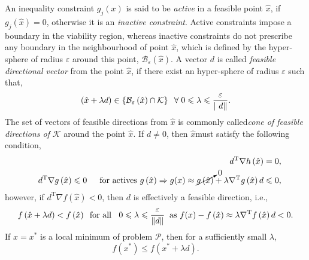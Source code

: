 An inequality constraint $g_{j}(x)$ is said to be {\it active} in a feasible point $\hat{x}$, if $g_{j}\left(\hat{x}\right)=0$, otherwise it is an {\it inactive constraint}. Active constraints impose a boundary in the viability region, whereas inactive constraints do not prescribe any boundary in the neighbourhood of point $\hat{x}$, which is defined by the hyper-sphere of radius $\varepsilon$ around this point, $\mathcal{B}_{\varepsilon}\left(\hat{x}\right)$. A vector $d$ is called {\it feasible directional vector} from the point $\hat{x}$, if there exist an hyper-sphere of radius $\varepsilon$ such that,
   \begin{displaymath}
      \left(\hat{x}+\lambda d\right) \in \left\{\mathcal{B}_{\varepsilon}\left(\hat{x}\right)\cap\mathcal{K}\right\}\;\;\forall \; 0\leqslant \lambda\leqslant \displaystyle\frac{\varepsilon}{\left|\ d\right\|}.
   \end{displaymath}
The set of vectors of feasible directions from $\hat{x}$ is commonly called{\it cone of feasible directions of} $\mathcal{K}$ around the point $\hat{x}$. If $d\ne 0$, then $\hat{x}$must satisfy the following condition,
   \begin{eqnarray}
      && d^{\text{T}}\nabla h\left(\hat{x}\right) = 0, \nonumber \\
      && d^{\text{T}}\nabla g\left(\hat{x}\right) \le 0 \;\;\;\ \text{ for actives } g\left(\hat{x}\right) \Rightarrow g(x)\approx \cancelto{0}{g\left(\hat{x}\right)} + \lambda\nabla^{\text{T}}g\left(\hat{x}\right)d \le 0, \nonumber
   \end{eqnarray}
however, if $d^{\text{T}}\nabla f\left(\hat{x}\right)< 0$, then $d$ is effectively a feasible direction, i.e., 
    \begin{displaymath}
       f\left(\hat{x}+\lambda d\right) < f\left(\hat{x}\right)\;\;\text{for all }\;\; 0\leqslant\lambda\leqslant\displaystyle\frac{\varepsilon}{\left\|d\right\|}\;\;\text{as } f(x)-f\left(\hat{x}\right)\approx \lambda\nabla^{\text{T}} f\left(\hat{x}\right)d < 0.
    \end{displaymath}
If $\hat{x}=x^{\ast}$ is a local minimum of problem $\mathcal{P}$, then for a sufficiently small $\lambda$,
    \begin{displaymath}
       f\left(x^{\ast}\right) \le f\left(x^{\ast}+\lambda d\right).
    \end{displaymath}

